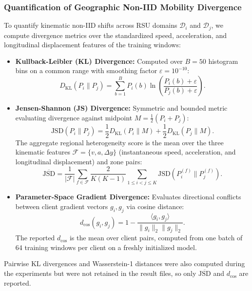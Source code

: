 \documentclass[journal]{IEEEtran}
\begin{document}
\subsubsection{Quantification of Geographic Non-IID Mobility Divergence}
To quantify kinematic non-IID shifts across RSU domains $\mathcal{D}_i$ and $\mathcal{D}_j$, we compute divergence metrics over the standardized speed, acceleration, and longitudinal displacement features of the training windows:
\begin{itemize}
    \item \textbf{Kullback-Leibler (KL) Divergence:} Computed over $B=50$ histogram bins on a common range with smoothing factor $\varepsilon = 10^{-10}$:
    \begin{equation}
    D_{\mathrm{KL}}(P_i \parallel P_j) = \sum_{b=1}^B P_i(b) \ln \left( \frac{P_i(b) + \varepsilon}{P_j(b) + \varepsilon} \right).
    \label{eq:kl_div}
    \end{equation}
    \item \textbf{Jensen-Shannon (JS) Divergence:} Symmetric and bounded metric evaluating divergence against midpoint $M = \frac{1}{2}(P_i + P_j)$:
    \begin{equation}
    \mathrm{JSD}(P_i \parallel P_j) = \frac{1}{2} D_{\mathrm{KL}}(P_i \parallel M) + \frac{1}{2} D_{\mathrm{KL}}(P_j \parallel M).
    \label{eq:jsd}
    \end{equation}
    The aggregate regional heterogeneity score is the mean over the three kinematic features $\mathcal{F} = \{v, a, \Delta y\}$ (instantaneous speed, acceleration, and longitudinal displacement) and zone pairs:
    \begin{equation}
    \overline{\mathrm{JSD}} = \frac{1}{|\mathcal{F}|} \sum_{f \in \mathcal{F}} \frac{2}{K(K-1)} \sum_{1 \le i < j \le K} \mathrm{JSD}(P_i^{(f)} \parallel P_j^{(f)}).
    \label{eq:mean_jsd}
    \end{equation}
    \item \textbf{Parameter-Space Gradient Divergence:} Evaluates directional conflicts between client gradient vectors $g_i, g_j$ via cosine distance:
    \begin{equation}
    d_{\mathrm{cos}}(g_i, g_j) = 1 - \frac{\langle g_i, g_j \rangle}{\|g_i\|_2 \|g_j\|_2}.
    \label{eq:cos_div}
    \end{equation}
    The reported $d_{\cos}$ is the mean over client pairs, computed from one batch of 64 training windows per client on a freshly initialized model.
\end{itemize}
Pairwise KL divergences and Wasserstein-1 distances were also computed during the experiments but were not retained in the result files, so only $\overline{\mathrm{JSD}}$ and $d_{\cos}$ are reported.
\end{document}
